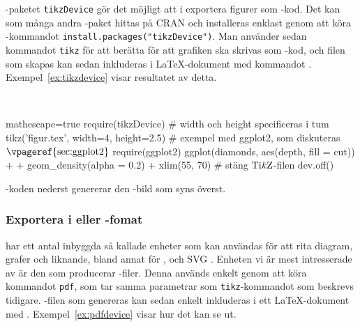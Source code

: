 \documentclass[../../a4.tex]{subfiles}
\begin{document}
\Rlogo-paketet \texttt{tikzDevice} \cite{Sharpsteen12} gör det möjligt
att i \Rlogo exportera figurer som \PGFTikZ-kod. Det kan som många andra
\Rlogo-paket hittas på CRAN och installeras enklast genom att köra
\Rlogo-kommandot \verb|install.packages("tikzDevice")|. Man använder
sedan kommandot \texttt{tikz} för att berätta för \Rlogo att grafiken
ska skrivas som \PGFTikZ-kod, och filen som skapas kan sedan inkluderas
i \LaTeX-dokument med kommandot .
Exempel~\vref{ex:tikzdevice} visar resultatet av detta.

\begin{kod}[tbp]
	\centering
	\begin{minipage}{\textwidth}
		\centering
		
	\end{minipage}
	\\[1ex]
	\begin{minipage}{\textwidth}
		\begin{rcode*}{mathescape=true}
require(tikzDevice)
# width och height specificeras i tum
tikz('figur.tex', width=4, height=2.5)
# exempel med ggplot2, som diskuteras$\text{\vpageref{sec:ggplot2}}$
require(ggplot2)
ggplot(diamonds, aes(depth, fill = cut)) +
  + geom_density(alpha = 0.2) + xlim(55, 70)
# stäng $\text{Ti\textit{k}Z}$-filen
dev.off()
		\end{rcode*}
	\end{minipage}
	\caption{\Rlogo-koden nederst genererar den \PGFTikZ-bild som
	syns överst.}
	\label{ex:tikzdevice}
\end{kod}


\subsubsection{Exportera i \PDF eller \PNG-fomat}

\Rlogo har ett antal inbyggda så kallade enheter  som kan
användas för att rita diagram, grafer och liknande, bland annat för \EPS,
\PNG och \textsc{SVG} \cite[s.~713]{RCoreTeam12}. Enheten vi är mest
intresserade av är den som producerar \PDF-filer. Denna används enkelt
genom att köra kommandot \texttt{pdf}, som tar samma parametrar som
\texttt{tikz}-kommandot som beskrevs tidigare. \PDF-filen som genereras
kan sedan enkelt inkluderas i ett \LaTeX-dokument med .
Exempel~\vref{ex:pdfdevice} visar hur det kan se ut.
\end{document}
